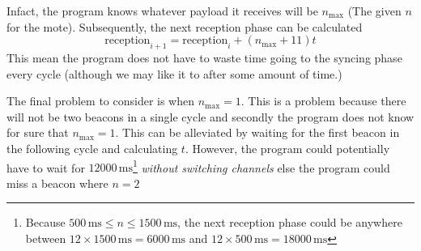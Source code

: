 \documentclass{report}
\newcommand{\reception}[1]{\text{reception}_{#1}}
\newcommand{\ms}{\, \mathrm{ms}}
\newcommand{\nmax}{n_{\text{max}}}
\begin{document}
Infact, the program knows whatever payload it receives will be $\nmax$ (The given $n$ for the mote). Subsequently, the next reception phase can be calculated
\[\reception{i+1} = \reception{i} + (\nmax + 11) t\]
This mean the program does not have to waste time going to the syncing phase every cycle (although we may like it to after some amount of time.)

The final problem to consider is when $\nmax = 1$. This is a problem because there will not be two beacons in a single cycle and secondly the program does not know for sure that $\nmax = 1$. This can be alleviated by waiting for the first beacon in the following cycle and calculating $t$. However, the program could potentially have to wait for $12000\ms$\footnote{Because $500\ms \leq n \leq 1500\ms$, the next reception phase could be anywhere between $12 \times 1500\ms = 6000\ms$ and $12 \times 500\ms = 18000\ms$} \emph{without switching channels} else the program could miss a beacon where $n = 2$







%
\end{document}
